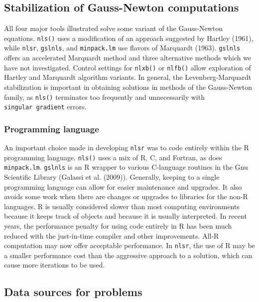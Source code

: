 \hypertarget{stabilization-of-gauss-newton-computations}{%
\subsection{Stabilization of Gauss-Newton computations}\label{stabilization-of-gauss-newton-computations}}

All four major tools illustrated solve some variant of the Gauss-Newton
equations. \texttt{nls()} uses a modification of an approach suggested by Hartley (1961),
while \texttt{nlsr}, \texttt{gslnls}, and \texttt{minpack.lm} use flavors of Marquardt (1963). \texttt{gslnls}
offers an accelerated Marquardt method and three alternative methods which we
have not investigated.
Control settings for \texttt{nlxb()} or \texttt{nlfb()} allow exploration of Hartley and Marquardt
algorithm variants. In general, the Levenberg-Marquardt stabilization
is important in obtaining
solutions in methods of the Gauss-Newton family, as \texttt{nls()} terminates
too frequently and unnecessarily with \texttt{singular\ gradient} errors.

\hypertarget{programming-language}{%
\subsubsection{Programming language}\label{programming-language}}

An important choice made in developing \texttt{nlsr} was to code entirely within the R
programming language. \texttt{nls()} uses a mix of R, C, and Fortran, as does \texttt{minpack.lm}.
\texttt{gslnls} is an R wrapper to various C-language routines in the Gnu Scientific
Library (Galassi et al. (2009)).
Generally, keeping to a single programming language can allow for
easier maintenance and upgrades. It also avoids some work when there are changes
or upgrades to libraries for the non-R languages.
R is usually considered slower
than most computing environments because it keeps track of objects and
because it is usually interpreted. In recent years, the
performance penalty for using code entirely in R has been much reduced
with the just-in-time compiler and other improvements. All-R computation
may now offer acceptable performance. In \texttt{nlsr}, the use of R may be a
smaller performance cost than the aggressive approach to a solution,
which can cause more iterations to be used.

\hypertarget{data-sources-for-problems}{%
\subsection{Data sources for problems}\label{data-sources-for-problems}}

